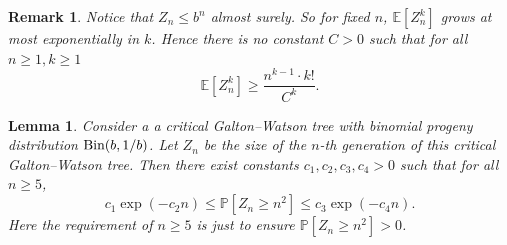 \documentclass[12pt]{article}
\newtheorem{lemma}[theorem]{Lemma}
\newtheorem{remark}[theorem]{Remark}
\numberwithin{equation}{section}
\newcommand{\1}{\mathbf{1}}
\begin{document}
\begin{remark}
	Notice that $Z_n\leq b^n$ almost surely. So for fixed $n$, $\mathbb{E}[Z_n^k]$ grows at most exponentially in $k$. 
	Hence there is no constant $C>0$ such that for all $n\geq1,k\geq1$
	\[
	\mathbb{E}[Z_n^k]\geq \frac{n^{k-1} \cdot k!}{C^k}.
	\]
\end{remark}



\begin{lemma}\label{lem: bounds on the n-th generation size of a critical GW tree bigger than square of n}
	Consider a a critical Galton--Watson tree with binomial progeny distribution   $\textnormal{Bin}(b,1/b)$. Let $Z_n$ be the size of the $n$-th generation of this critical Galton--Watson tree.  Then there exist constants $c_1,c_2,c_3,c_4>0$ such that for all $n\geq 5$,
	\[
	c_1\exp(-c_2n)\leq \mathbb{P}[Z_n\geq n^2]\leq c_3\exp(-c_4n).
	\]
	Here the requirement of $n\geq 5$ is just to ensure $\mathbb{P}[Z_n\geq n^2]>0$.
\end{lemma}
\end{document}
